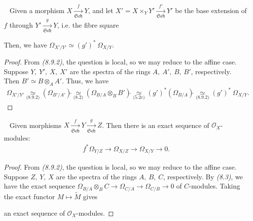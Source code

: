 \documentclass[11pt,a4paper,footinclude=true,headinclude=true]{scrbook} %
\newcommand{\OO}{\mathcal{O}}
\newcommand{\Sch}{\mathfrak{Sch}}
\newcommand{\<}{\langle}
\newcommand{\>}{\rangle}
\newcommand\FibSq[2][\square]{%
  \arrow[mysymbol]{#2}[description]{#1}}
\newenvironment{proposition}[2][]
{\renewcommand\theinnercustomprop{#2}\innercustomprop[#1] 
\begin{mdframed}[backgroundcolor=gray!20]\ }
{\end{mdframed}\endinnercustomprop}
\begin{document}
\begin{proposition}{8.10}
    Given a morphism $X\xrightarrow[\Sch]{f}Y$, and let $X'=X\times_YY'\xrightarrow[\Sch]{f'}Y'$ be the base extension of $f$ through $Y'\xrightarrow[\Sch]{g}Y$, i.e. the fibre square
    \begin{center}
    \end{center}
    Then, we have $\Omega_{X'/Y'}\simeq(g')^\ast\ \Omega_{X/Y}$.
\end{proposition}
\begin{proof}
    From \textit{(8.9.2)}, the question is local, so we may reduce to the affine case. Suppose $Y,\ Y',\ X,\ X'$ are the spectra of the rings $A,\ A',\ B,\ B'$, respectively. Then $B'\simeq B\otimes_AA'$. Thus, we have
    \begin{align*}
        \Omega_{X'/Y'}\underset{\textit{(8.9.2)}}{\simeq}(\Omega_{B'/A'})\widetilde{}\underset{\textit{(8.2)}}{\simeq}(\Omega_{B/A}\otimes_BB')\widetilde{}\underset{\textit{(5.2e)}}{\simeq}(g')^\ast(\Omega_{B/A})\widetilde{}\underset{\textit{(8.9.2)}}{\simeq}(g')^\ast\ \Omega_{X/Y}.
    \end{align*}
\end{proof}

\begin{proposition}{8.11}
    Given morphisms $X\xrightarrow[\Sch]{f}Y\xrightarrow[\Sch]{g}Z$. Then there is an exact sequence of $\OO_X$-modules:
    \begin{align*}
        f^\ast\Omega_{Y/Z}\longrightarrow\Omega_{X/Z}\longrightarrow\Omega_{X/Y}\longrightarrow0.
    \end{align*}
\end{proposition}
\begin{proof}
     From \textit{(8.9.2)}, the question is local, so we may reduce to the affine case. Suppose $Z,\ Y,\ X$ are the spectra of the rings $A,\ B,\ C$, respectively. By \textit{(8.3)}, we have the exact sequence $\Omega_{B/A}\otimes_BC\to\Omega_{C/A}\to\Omega_{C/B}\to0$ of $C$-modules. Taking the exact functor $M\mapsto\widetilde{M}$ gives
     \begin{center}
     \end{center}
     an exact sequence of $\OO_X$-modules.
\end{proof}
\end{document}
